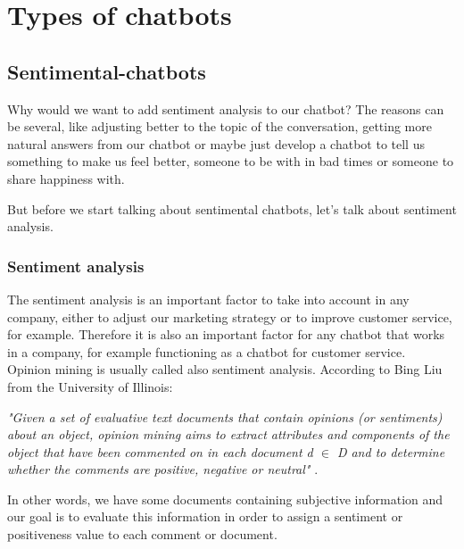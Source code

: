 \documentclass[12pt,twoside]{article}
\theoremstyle{plain}
\theoremstyle{definition}
\theoremstyle{remark}
\begin{document}
\section{Types of chatbots}
	\label{sec:types}
	



	\subsection{Sentimental-chatbots}
	\label{sec:sentimental}
	
	Why would we want to add sentiment analysis to our chatbot? The reasons can be several, like adjusting better to the topic of the conversation, getting more natural answers from our chatbot or maybe just develop a chatbot to tell us something to make us feel better, someone to be with in bad times or someone to share happiness with.
	
	But before we start talking about sentimental chatbots, let's talk about sentiment analysis.
	
		\subsubsection{Sentiment analysis}
		\label{sec::sentiment_analysis}
		
		The sentiment analysis is an important factor to take into account in any company, either to adjust our marketing strategy or to improve customer service, for example. Therefore it is also an important factor for any chatbot that works in a company, for example functioning as a chatbot for customer service.\\
		
		Opinion mining is usually called also sentiment analysis. According to Bing Liu from the University of Illinois: \\
		
		\begin{center}
			\textit{"Given a set of evaluative text documents that contain opinions (or sentiments) about an object, opinion mining aims to extract attributes and components of the object that have been commented on in each document d $\in$ D and to determine whether the comments are positive, negative or neutral"} \cite{bingliu_sentiment_definition}.
		\end{center}
		
		In other words, we have some documents containing subjective information and our goal is to evaluate this information in order to assign a sentiment or positiveness value to each comment or document.\\
		
\end{document}
